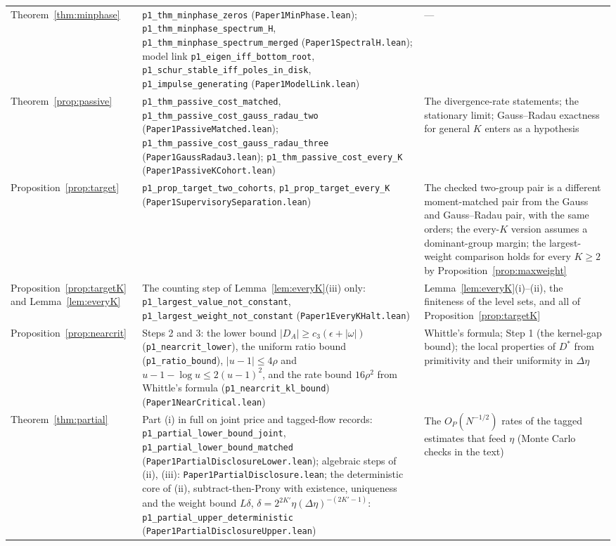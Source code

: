 \begin{longtable}{>{\raggedright\arraybackslash}p{}>{\raggedright\arraybackslash}p{}>{\raggedright\arraybackslash}p{}}
Theorem~\ref{thm:minphase} & \texttt{p1\_thm\_minphase\_zeros} (\nolinkurl{Paper1MinPhase.lean}); \texttt{p1\_thm\_minphase\_spectrum\_H}, \texttt{p1\_thm\_minphase\_spectrum\_merged} (\nolinkurl{Paper1SpectralH.lean}); model link \texttt{p1\_eigen\_iff\_bottom\_root}, \texttt{p1\_schur\_stable\_iff\_poles\_in\_disk}, \texttt{p1\_impulse\_generating} (\nolinkurl{Paper1ModelLink.lean}) & ---\\
Theorem~\ref{prop:passive} & \texttt{p1\_thm\_passive\_cost\_matched}, \texttt{p1\_thm\_passive\_cost\_gauss\_radau\_two} (\nolinkurl{Paper1PassiveMatched.lean}); \nolinkurl{p1_thm_passive_cost_gauss_radau_three} (\nolinkurl{Paper1GaussRadau3.lean}); \texttt{p1\_thm\_passive\_cost\_every\_K} (\nolinkurl{Paper1PassiveKCohort.lean}) & The divergence-rate statements; the stationary limit; Gauss--Radau exactness for general $K$ enters as a hypothesis\\
Proposition~\ref{prop:target} & \texttt{p1\_prop\_target\_two\_cohorts}, \texttt{p1\_prop\_target\_every\_K} (\nolinkurl{Paper1SupervisorySeparation.lean}) & The checked two-group pair is a different moment-matched pair from the Gauss and Gauss--Radau pair, with the same orders; the every-$K$ version assumes a dominant-group margin; the largest-weight comparison holds for every $K\ge 2$ by Proposition~\ref{prop:maxweight}\\
Proposition~\ref{prop:targetK} and Lemma~\ref{lem:everyK} & The counting step of Lemma~\ref{lem:everyK}(iii) only: \texttt{p1\_largest\_value\_not\_constant}, \texttt{p1\_largest\_weight\_not\_constant} (\nolinkurl{Paper1EveryKHalt.lean}) & Lemma~\ref{lem:everyK}(i)--(ii), the finiteness of the level sets, and all of Proposition~\ref{prop:targetK}\\
Proposition~\ref{prop:nearcrit} & Steps 2 and 3: the lower bound $|D_A|\ge c_3(\epsilon+|\omega|)$ (\texttt{p1\_nearcrit\_lower}), the uniform ratio bound (\texttt{p1\_ratio\_bound}), $|u-1|\le4\rho$ and $u-1-\log u\le2(u-1)^2$, and the rate bound $16\rho^2$ from Whittle's formula (\texttt{p1\_nearcrit\_kl\_bound}) (\nolinkurl{Paper1NearCritical.lean}) & Whittle's formula; Step 1 (the kernel-gap bound); the local properties of $D^*$ from primitivity and their uniformity in $\Delta\eta$\\
Theorem~\ref{thm:partial} & Part (i) in full on joint price and tagged-flow records: \texttt{p1\_partial\_lower\_bound\_joint}, \texttt{p1\_partial\_lower\_bound\_matched} (\nolinkurl{Paper1PartialDisclosureLower.lean}); algebraic steps of (ii), (iii): \nolinkurl{Paper1PartialDisclosure.lean}; the deterministic core of (ii), subtract-then-Prony with existence, uniqueness and the weight bound $L\delta$, $\delta=2^{2K'}\eta(\Delta\eta)^{-(2K'-1)}$: \texttt{p1\_partial\_upper\_deterministic} (\nolinkurl{Paper1PartialDisclosureUpper.lean}) & The $O_P(N^{-1/2})$ rates of the tagged estimates that feed $\eta$ (Monte Carlo checks in the text)\\

\end{longtable}
